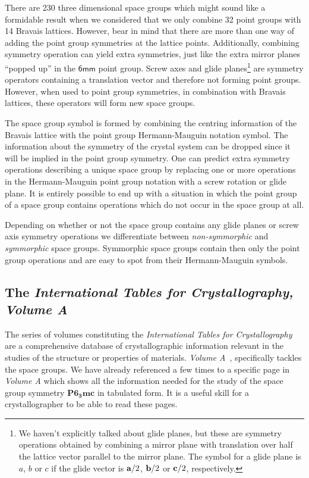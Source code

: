 There are 230 three dimensional space groups which might sound like a formidable result when we considered that we only combine 32 point groups with 14 Bravais lattices. However, bear in mind that there are more than one way of adding the point group symmetries at the lattice points. Additionally, combining symmetry operation can yield extra symmetries, just like the extra mirror planes ``popped up'' in the $\mathsf{6mm}$ point group. Screw axes and glide planes\footnote{ We haven't explicitly talked about glide planes, but these are symmetry operations obtained by combining a mirror plane with translation over half the lattice vector parallel to the mirror plane. The symbol for a glide plane is $a$, $b$ or $c$ if the glide vector is $\vb{a}/2$, $\vb{b}/2$ or $\vb{c}/2$, respectively.} are symmetry operators containing a translation vector and therefore not forming point groups. However, when used to point group symmetries, in combination with Bravais lattices, these operators will form new space groups. 

The space group symbol is formed by combining the centring information of the Bravais lattice with the point group Hermann-Mauguin notation symbol. The information about the symmetry of the crystal system can be dropped since it will be implied in the point group symmetry. One can predict extra symmetry operations describing a unique space group by replacing one or more operations in the Hermann-Mauguin point group notation with a screw rotation or glide plane. It is entirely possible to end up with a situation in which the point group of a space group contains operations which do not occur in the space group at all.  
 
Depending on whether or not the space group contains any glide planes or screw axis symmetry operations we differentiate between \textit{non-symmorphic} and \textit{symmorphic} space groups. Symmorphic space groups contain then only the point group operations and are easy to spot from their Hermann-Mauguin symbols.






 


\subsection{The \textit{International Tables for Crystallography, Volume A}}
\label{chap:int}

The series of volumes constituting the \textit{International Tables for Crystallography} are a comprehensive database of crystallographic information relevant in the studies of the structure or properties of materials. \textit{Volume A}~\cite{IntTableCrysA}, specifically tackles the space groups. We have already referenced a few times to a specific page in \textit{Volume A} which shows all the information needed for the study of the space group symmetry $\mathbf{P6_3mc}$ in tabulated form. It is a useful skill for a crystallographer to be able to read these pages.

